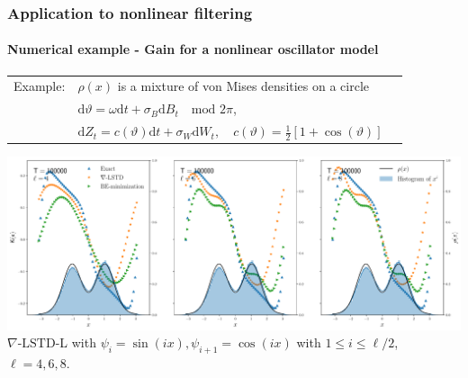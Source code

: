 \documentclass[xcolor=dvipsnames, subsection=false]{beamer}
\def\alertb#1{\alert{\color{BrickRed}  #1}}
\def\alertb#1{\alert{\color{BrickRed}  #1}}
\def\gradTD{\nabla\text{-LSTD}}
\def\basis{\psi}
\def\oscState{\vartheta}
\def\ud{\text{d}}
\newcommand{\pr}{\rho}
\begin{document}
\begin{frame}
\frametitle{Application to nonlinear filtering}
\framesubtitle{Numerical example - Gain for a nonlinear oscillator model}
\begin{minipage}[t][6.5cm][t]{\textwidth}
	\begin{tabular}{lll}\alertb{Example:} & $\pr(x)$ is a mixture of von Mises densities on a circle \\
	& $\ud \oscState = \omega \ud t+\sigma_{B}\ud B_t \quad \text{mod }2\pi$,	\\
	& $\ud Z_t = c(\oscState)\ud t+ \sigma_{W} \ud  W_t, \quad c(\oscState)=\frac{1}{2}[1+\cos(\oscState)]$
\end{tabular}
		\centering
		\includegraphics[width= \hsize]{Chap4_nl_oscillator_be.pdf}\\
		$\gradTD$-L with $\basis_i = \sin(ix), \basis_{i+1} = \cos(ix)$ with $1 \leq i \leq \ell/2$, $\ell = 4,6,8$.
\end{minipage}
\end{frame}
\end{document}

